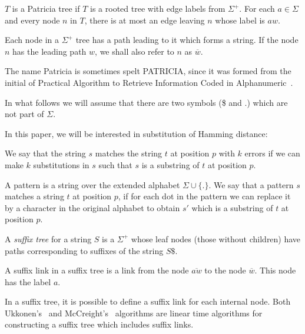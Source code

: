\begin{definition}
$T$ is a Patricia tree if $T$ is a rooted tree with edge labels from $\Sigma^+$. For each $a \in \Sigma$ and every node $n$ in $T$, there is at most an edge leaving $n$ whose label is $aw$.

Each node in a $\Sigma^+$ tree has a path leading to it which forms a string. If the node $n$ has the leading path $w$, we shall also refer to $n$ as $\overline{w}$.
\end{definition}

The name Patricia is sometimes spelt PATRICIA, since it was formed from the initial of Practical Algorithm to Retrieve Information Coded in Alphanumeric~\cite{morrison:patricia}.

In what follows we will assume that there are two symbols (\$ and $.$) which are not part of $\Sigma$.

In this paper, we will be interested in substitution of Hamming distance:

\begin{definition}
We say that the string $s$ matches the string $t$ at position $p$ with $k$ errors if we can make $k$ substitutions in $s$ such that $s$ is a substring of $t$ at position $p$.
\end{definition}


\begin{definition}[Pattern]
A pattern is a string over the extended alphabet $\Sigma\cup\{.\}$. We say that a pattern $s$ matches a string $t$ at position $p$, if for each dot in the pattern we can replace it by a character in the original alphabet to obtain $s'$ which is a substring of $t$ at position $p$.
\end{definition}

\begin{definition}
A \emph{suffix tree} for a string $S$ is a $\Sigma^+$ whose leaf nodes (those without children) have paths corresponding to suffixes of the string $S\$ $.
\end{definition}

\begin{definition}
A suffix link in a suffix tree is a link from the node $\overline{aw}$ to the node $\overline{w}$. This node has the label $a$.
\end{definition}

In a suffix tree, it is possible to define a suffix link for each internal node. Both Ukkonen's~\cite{ukkonen} and McCreight's~\cite{mccreight} algorithms are linear time algorithms for constructing a suffix tree which includes suffix links.

